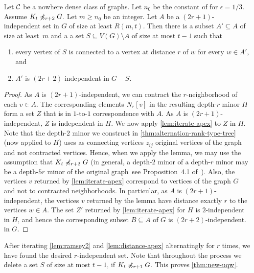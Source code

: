 \begin{lemma}\label{lem:distance-apex}
Let $\mathcal{C}$ be a nowhere dense class of graphs. 
Let $n_0$ be the constant of for $\epsilon=1/3$. 
Assume $K_t\not\preccurlyeq_{r+2} G$. 
Let $m\geq n_0$ be an integer. 
Let $A$ be a $(2r+1)$-independent set in $G$ of size at least $R(m,t)$. 
Then there is a subset $A'\subseteq A$ of size at least~$m$ and a 
a set $S\subseteq V(G)\setminus A$ of size at most $t-1$ such that
\begin{enumerate}
\item every vertex of $S$ is connected to a vertex at distance $r$ of $w$ for 
every $w\in A'$, and
\item $A'$ is $(2r+2)$-independent in $G-S$. 
\end{enumerate} 
\end{lemma}
\begin{proof}
As $A$ is $(2r+1)$-independent, we can contract the $r$-neighborhood
of each $v\in A$. The corresponding elements $N_r[v]$ in the resulting 
depth-$r$ minor $H$ form a set $Z$ that is in $1$-to-$1$ correspondence 
with $A$. As $A$
is $(2r+1)$-independent, $Z$ is independent in $H$. We now apply 
\cref{lem:iterate-apex} to $Z$ in $H$. Note that the depth-$2$ minor
we construct in \cref{thm:alternation-rank-type-tree} (now applied to $H$) 
uses as connecting vertices $z_{ij}$ original vertices of the graph and
not contracted vertices. Hence, when we apply the lemma, we may 
use the assumption that $K_t\not\preccurlyeq_{r+2} G$ (in general, 
a depth-$2$ minor of a depth-$r$ minor may be a depth-$5r$ minor
of the original graph~see Proposition~4.1 of~\cite{sparsity}). 
Also, the vertices $v$ returned by 
\cref{lem:iterate-apex} correspond to vertices of the graph $G$ and not
to contracted neighborhoods. In particular, as $A$ is $(2r+1)$-independent, 
the vertices $v$ returned by the lemma have distance exactly $r$ to 
the vertices $w\in A$. The set $Z'$ returned by \cref{lem:iterate-apex}
for $H$ is $2$-independent in $H$, and hence the corresponding 
subset $B\subseteq A$ of $G$ is $(2r+2)$-independent. 
in $G$. 
\end{proof}

After iterating \cref{lem:ramsey2} and \cref{lem:distance-apex} 
alternatingly
for $r$ times, we have found the desired $r$-independent set. Note
that throughout the process we delete a set $S$ of size at most
$t-1$, if $K_t\not\preccurlyeq_{r+1} G$. This proves \cref{thm:new-uqw}. 
